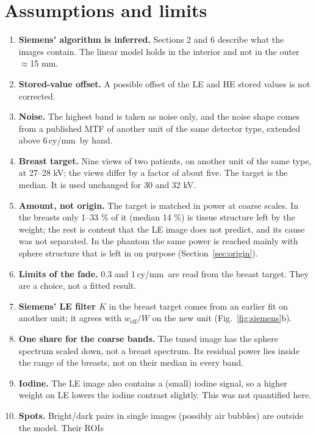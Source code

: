 \documentclass[11pt,a4paper]{article}
\newcommand{\weff}{w_\mathrm{eff}}
\newcommand{\cymm}{\,cy/mm}
\begin{document}
\section{Assumptions and limits}
\begin{enumerate}
\item \textbf{Siemens' algorithm is inferred.} Sections 2 and 6 describe what the images contain. The linear model
holds in the interior and not in the outer $\approx$15 mm.
\item \textbf{Stored-value offset.} A possible offset of the LE and HE stored values is not corrected.
\item \textbf{Noise.} The highest band is taken as noise only, and the noise shape comes from a published MTF of
another unit of the same detector type, extended above 6\cymm\ by hand.
\item \textbf{Breast target.} Nine views of two patients, on another unit of the same type, at 27--28 kV; the views
differ by a factor of about five. The target is the median. It is used unchanged for 30 and 32 kV.
\item \textbf{Amount, not origin.} The target is matched in power at coarse scales. In the breasts only 1--33 \% of
it (median 14 \%) is tissue structure left by the weight; the rest is content that the LE image does not predict,
and its cause was not separated. In the phantom the same power is reached mainly with sphere structure that is left
in on purpose (Section~\ref{sec:origin}).
\item \textbf{Limits of the fade.} 0.3 and 1\cymm\ are read from the breast target. They are a choice, not a fitted
result.
\item \textbf{Siemens' LE filter $K$} in the breast target comes from an earlier fit on another unit; it agrees with
$\weff/W$ on the new unit (Fig.~\ref{fig:siemens}b).
\item \textbf{One share for the coarse bands.} The tuned image has the sphere spectrum scaled down, not a breast
spectrum. Its residual power lies inside the range of the breasts, not on their median in every band.
\item \textbf{Iodine.} The LE image also contains a (small) iodine signal, so a higher weight on LE lowers the
iodine contrast slightly. This was not quantified here.
\item \textbf{Spots.} Bright/dark pairs in single images (possibly air bubbles) are outside the model. Their ROIs

\end{enumerate}
\end{document}
